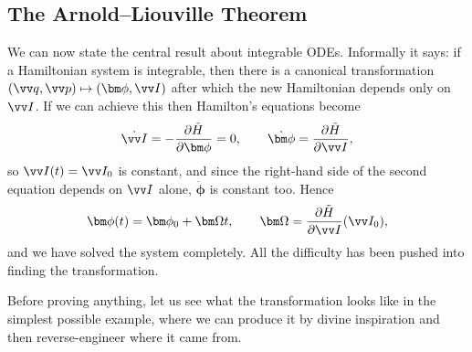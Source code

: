 \subsection{The Arnold--Liouville Theorem}

We can now state the central result about integrable ODEs. Informally it says: if a Hamiltonian system is integrable, then there is a canonical transformation $(\vv q, \vv p)\mapsto(\bm\phi, \vv I)$ after which the new Hamiltonian depends only on $\vv I$. If we can achieve this then Hamilton's equations become
$$
\dot{\vv I} = -\frac{\partial \tilde H}{\partial \bm\phi} = 0, \qquad \dot{\bm\phi} = \frac{\partial \tilde H}{\partial \vv I},
$$
so $\vv I(t) = \vv I_0$ is constant, and since the right-hand side of the second equation depends on $\vv I$ alone, $\dot{\bm\phi}$ is constant too. Hence
$$
\bm\phi(t) = \bm\phi_0 + \bm\Omega t, \qquad \bm\Omega = \frac{\partial \tilde H}{\partial \vv I}(\vv I_0),
$$
and we have solved the system completely. All the difficulty has been pushed into finding the transformation.

Before proving anything, let us see what the transformation looks like in the simplest possible example, where we can produce it by divine inspiration and then reverse-engineer where it came from.

